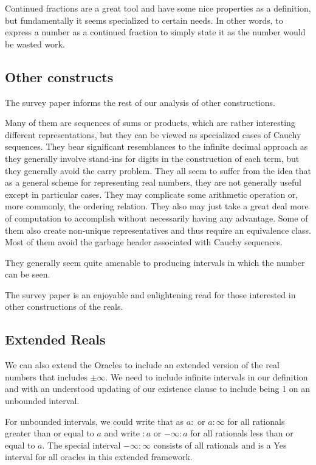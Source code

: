 \documentclass[12pt]{article}
\theoremstyle{remark}
\begin{document}
Continued fractions are a great tool and have some nice properties as a definition, but fundamentally it seems specialized to certain needs. In other words, to express a number as  a continued fraction to simply state it as the number would be wasted work. 

\subsection{Other constructs}

The survey paper \cite{ittay-2015} informs the rest of our analysis of other constructions. 

Many of them are sequences of sums or products, which are rather interesting different representations, but they can be viewed as specialized cases of Cauchy sequences. They bear significant resemblances to the infinite decimal approach as they generally involve stand-ins for digits in the construction of each term, but they generally avoid the carry problem. They all seem to suffer from the idea that as a general scheme for representing real numbers, they are not generally useful except in particular cases. They may complicate some arithmetic operation or, more commonly, the ordering relation. They also may just take a great deal more of computation to accomplish without necessarily having any advantage. Some of them also create non-unique representatives and thus require an equivalence class. Most of them avoid the garbage header associated with Cauchy sequences. 

They generally seem quite amenable to producing intervals in which the number can be seen.

The survey paper is an enjoyable and enlightening read for those interested in other constructions of the reals. 

\subsection{Extended Reals}

We can also extend the Oracles to include an extended version of the real numbers that includes $\pm \infty$. We need to include infinite intervals in our definition and with an understood updating of our existence clause to include being 1 on an unbounded interval.

For unbounded intervals, we could write that as $a:$ or $a:\infty$ for all rationals greater than or equal to $a$ and write $:a$ or $-\infty:a$ for all rationals less than or equal to $a$. The special interval $-\infty:\infty$ consists of all rationals and is a Yes interval for all oracles in this extended framework. 
\end{document}

